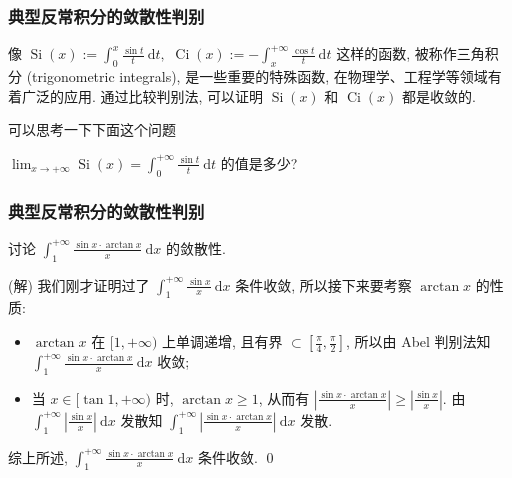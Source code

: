 
\begin{frame}
\frametitle{典型反常积分的敛散性判别}

像 $\operatorname{Si}(x) := \int_0^x \frac{\sin t}{t} ~ \mathrm{d} t,$ $\operatorname{Ci}(x) := -\int_x^{+\infty} \frac{\cos t}{t} ~ \mathrm{d} t$ 这样的函数, 被称作三角积分 (trigonometric integrals), 是一些重要的特殊函数, 在物理学、工程学等领域有着广泛的应用. 通过比较判别法, 可以证明 $\operatorname{Si}(x)$ 和 $\operatorname{Ci}(x)$ 都是收敛的.

\pause
\vspace{1em}

可以思考一下下面这个问题

\begin{question}
$\lim_{x \to +\infty} \operatorname{Si}(x) = \int_0^{+\infty} \frac{\sin t}{t} ~ \mathrm{d} t$ 的值是多少?
\end{question}

\end{frame}


\begin{frame}
\frametitle{典型反常积分的敛散性判别}

\begin{eg}
讨论 $\displaystyle \int_1^{+\infty} \frac{\sin x \cdot \arctan x}{x} ~ \mathrm{d} x$ 的敛散性.
\end{eg}

\pause
\vspace{0.5em}

\startproof[bg=yellow, fg=red](解)
我们刚才证明过了 $\displaystyle \int_1^{+\infty} \frac{\sin x}{x} ~ \mathrm{d} x$ 条件收敛, 所以接下来要考察 $\arctan x$ 的性质:
\begin{itemize}
\item $\arctan x$ 在 $[1, +\infty)$ 上单调递增, 且有界 $\subset \left[ \frac{\pi}{4}, \frac{\pi}{2} \right]$, 所以由 Abel 判别法知 $\displaystyle \int_1^{+\infty} \frac{\sin x \cdot \arctan x}{x} ~ \mathrm{d} x$ 收敛;
\pause
\item 当 $x \in [\tan 1, +\infty)$ 时, $\arctan x \geqslant 1$, 从而有 $\displaystyle \left| \frac{\sin x \cdot \arctan x}{x} \right| \geqslant \left| \frac{\sin x}{x} \right|.$ 由 $\displaystyle \int_1^{+\infty} \left| \frac{\sin x}{x} \right| ~ \mathrm{d} x$ 发散知 $\displaystyle \int_1^{+\infty} \left| \frac{\sin x \cdot \arctan x}{x} \right| ~ \mathrm{d} x$ 发散.
\end{itemize}
\pause
综上所述, $\displaystyle \int_1^{+\infty} \frac{\sin x \cdot \arctan x}{x} ~ \mathrm{d} x$ 条件收敛.
\qed

\end{frame}

